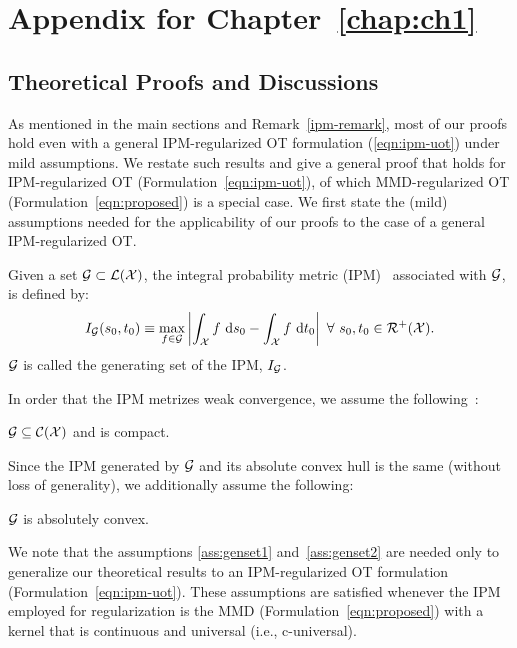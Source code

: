 \renewcommand{\thechapter}{A}
\chapter{Appendix for Chapter~\ref{chap:ch1}}\label{APP:A}

\renewcommand{\thesection}{A.\arabic{section}}
\renewcommand{\thesubsection}{A.\arabic{section}.\arabic{subsection}}
\renewcommand{\thefigure}{A.\arabic{figure}}
\renewcommand{\thetable}{A.\arabic{table}}
\renewcommand{\theequation}{A.\arabic{equation}}

\section{Theoretical Proofs and Discussions}\label{App:proofs}

As mentioned in the main sections and Remark~\ref{ipm-remark}, most of our proofs hold even with a general IPM-regularized OT formulation (\ref{eqn:ipm-uot}) under mild assumptions. We restate such results and give a general proof that holds for IPM-regularized OT (Formulation~\ref{eqn:ipm-uot}), of which  MMD-regularized OT (Formulation~\ref{eqn:proposed}) is a special case. We first state the (mild) assumptions needed for the applicability of our proofs to the case of a general IPM-regularized OT. 

 Given a set $\mathcal{G}\subset\mathcal{L}(\mathcal{X})$, the integral probability metric (IPM)~\citep{mullergenset97,Sriperumbudur09onintegral,agrawal20a} associated with $\mathcal{G}$, is defined by:
\begin{equation}\label{ipm-def}
     I_\calG(s_0,t_0)\equiv\max\limits_{f\in\calG}\left|\int_\calX f\ \textup{d}s_0-\int_\calX f\ \textup{d}t_0\right|\ \forall\ s_0,t_0\in\calR^+(\calX).
\end{equation}
$\mathcal{G}$ is called the generating set of the IPM, $ I_{\mathcal{G}}$.

\noindent In order that the IPM metrizes weak convergence, we assume the following~\citep{mullergenset97}:
\begin{assumption}\label{ass:genset1}
$\mathcal{G}\subseteq\mathcal{C}(\mathcal{X})$ and is compact.
\end{assumption}
\noindent Since the IPM generated by $\mathcal{G}$ and its absolute convex hull is the same (without loss of generality), we additionally assume the following:
\begin{assumption}\label{ass:genset2}
$\mathcal{G}$ is absolutely convex.
\end{assumption}
\begin{remark}
    We note that the assumptions 
\ref{ass:genset1} and~\ref{ass:genset2} are needed only to generalize our theoretical results to an IPM-regularized OT formulation (Formulation~\ref{eqn:ipm-uot}). These assumptions are satisfied whenever the IPM employed for regularization is the MMD (Formulation~\ref{eqn:proposed}) with a kernel that is continuous and universal (i.e., c-universal).
\end{remark}


